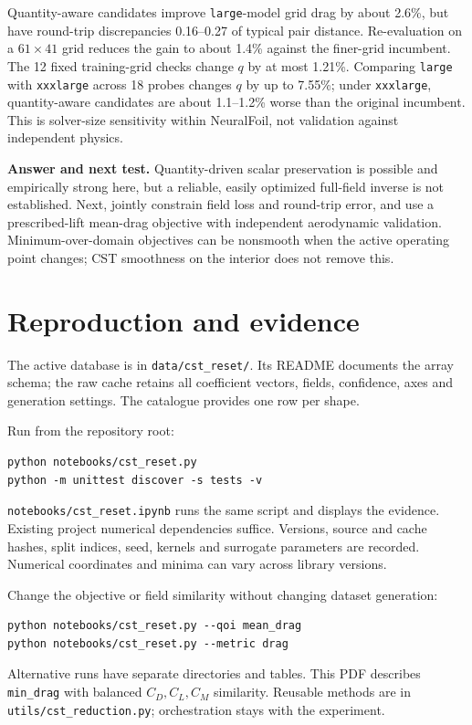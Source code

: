 \documentclass[10pt,a4paper]{article}
\begin{document}
Quantity-aware candidates improve \texttt{large}-model grid drag by about
2.6\%, but have round-trip discrepancies 0.16--0.27 of typical pair distance.
Re-evaluation on a $61\times41$ grid reduces the gain to about 1.4\% against
the finer-grid incumbent. The 12 fixed training-grid checks change $q$ by at
most 1.21\%. Comparing \texttt{large} with \texttt{xxxlarge} across 18 probes
changes $q$ by up to 7.55\%; under \texttt{xxxlarge}, quantity-aware candidates
are about 1.1--1.2\% worse than the original incumbent. This is solver-size
sensitivity within NeuralFoil, not validation against independent physics.

\textbf{Answer and next test.} Quantity-driven scalar preservation is possible
and empirically strong here, but a reliable, easily optimized full-field inverse
is not established. Next, jointly constrain field loss and round-trip error,
and use a prescribed-lift mean-drag objective with independent aerodynamic
validation. Minimum-over-domain objectives can be nonsmooth when the active
operating point changes; CST smoothness on the interior does not remove this.

\newpage
\section*{Reproduction and evidence}
The active database is in \texttt{data/cst\_reset/}. Its README documents the
array schema; the raw cache retains all coefficient vectors, fields, confidence,
axes and generation settings. The catalogue provides one row per shape.

Run from the repository root:
\begin{verbatim}
python notebooks/cst_reset.py
python -m unittest discover -s tests -v
\end{verbatim}
\texttt{notebooks/cst\_reset.ipynb} runs the same script and displays the
evidence. Existing project numerical dependencies suffice. Versions, source
and cache hashes, split indices, seed, kernels and surrogate parameters are
recorded. Numerical coordinates and minima can vary across library versions.

Change the objective or field similarity without changing dataset generation:
\begin{verbatim}
python notebooks/cst_reset.py --qoi mean_drag
python notebooks/cst_reset.py --metric drag
\end{verbatim}
Alternative runs have separate directories and tables. This PDF describes
\texttt{min\_drag} with balanced $C_D,C_L,C_M$ similarity. Reusable methods are
in \texttt{utils/cst\_reduction.py}; orchestration stays with the experiment.
\end{document}
